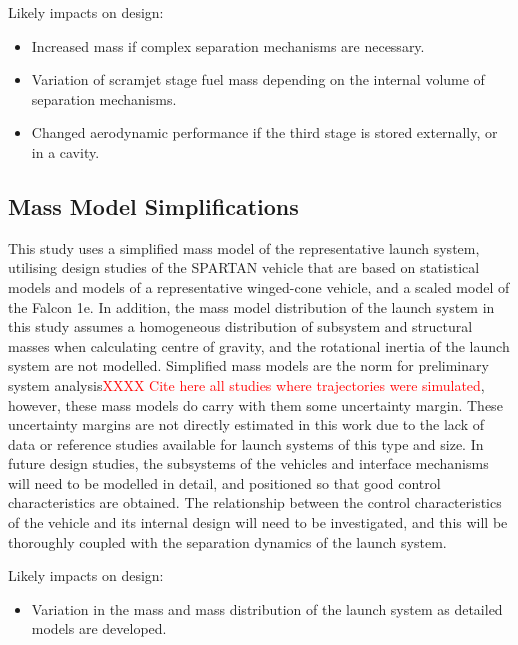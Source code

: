 
Likely impacts on design:
\begin{itemize}[noitemsep,topsep=0pt]
	\item Increased mass if complex separation mechanisms are necessary.
	\item Variation of scramjet stage fuel mass depending on the internal volume of separation mechanisms. 
	\item Changed aerodynamic performance if the third stage is stored externally, or in a cavity. 
\end{itemize}


\subsection{Mass Model Simplifications}

This study uses a simplified mass model of the representative launch system, utilising design studies of the SPARTAN vehicle\cite{Preller2017b} that are based on statistical models and models of a representative winged-cone vehicle\cite{Preller2018}, and a scaled model of the Falcon 1e\cite{Vehicle2008}. In addition, the mass model distribution of the launch system in this study assumes a homogeneous distribution of subsystem and structural masses when calculating centre of gravity, and the rotational inertia of the launch system are not modelled.
Simplified mass models are the norm for preliminary system analysis\textcolor{red}{XXXX Cite here all studies where trajectories were simulated}, however, these mass models do carry with them some uncertainty margin. These uncertainty margins are not directly estimated in this work due to the lack of data or reference studies available for launch systems of this type and size. 
In future design studies, the subsystems of the vehicles and interface mechanisms will need to be modelled in detail, and positioned so that good control characteristics are obtained. The relationship between the control characteristics of the vehicle and its internal design will need to be investigated, and this will be thoroughly coupled with the separation dynamics of the launch system. 

Likely impacts on design:
\begin{itemize}[noitemsep,topsep=0pt]
	\item Variation in the mass and mass distribution of the launch system as detailed models are developed. 
\end{itemize}


